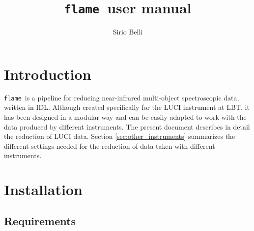 \documentclass[a4paper, notitlepage]{article}
\newcommand{\flame}{\texttt{flame}}
\begin{document}
\lstset{language=IDL}

\title{\flame\ user manual}
\author{Sirio Belli}
\maketitle





\section{Introduction}
\label{sec:introudction}

\flame\ is a pipeline for reducing near-infrared multi-object spectroscopic data, written in IDL. Although created specifically for the LUCI instrument at LBT, it has been designed in a modular way and can be easily adapted to work with the data produced by different instruments. The present document describes in detail the reduction of LUCI data. Section \ref{sec:other_instruments} summarizes the different settings needed for the reduction of data taken with different instruments.







\section{Installation}
\label{sec:installation}


\subsection{Requirements}
\end{document}
